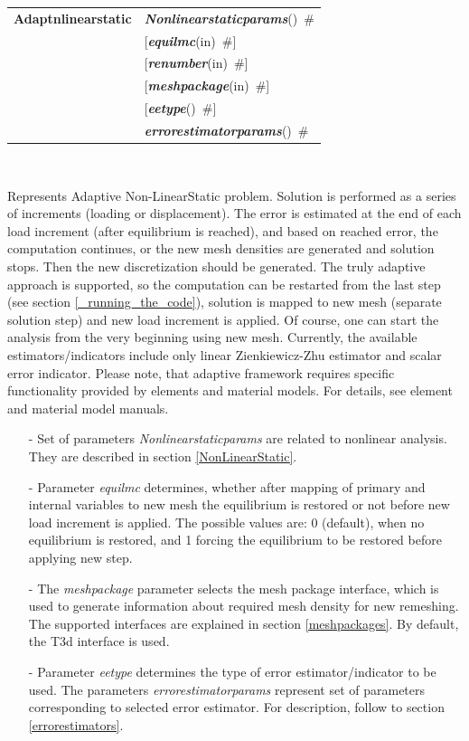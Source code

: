 \documentclass[a4paper]{article}
\makeatletter
\newcommand{\param}[1]{{\em #1}}
\newcommand{\keywordnotype}[1]{\mbox{{\it{\bf{#1}}}}}
\newcommand{\keyword}[2]{\mbox{{\keywordnotype{#1}\tiny (#2)}}}
\newcommand{\entKeywordInst}[1]{\mbox{{\bf{{#1}}}}}
\newcommand{\field}[2]{\mbox{\keyword{#1}{#2}~\#}}
\newcommand{\optField}[2]{\mbox{[\field{#1}{#2}]}}
\newenvironment{record}[1][]{\begin{tabular}{|ll}}{\end{tabular}\\}
\newcommand{\recentry}[2]{{#1}&{#2}\\}
\newcounter{rcc}
\newenvironment{record}[1][\textwidth]{\setcounter{rcc}{0}\begin{tabular*}{#1}{|ll@{\extracolsep{\fill}}r}}{\end{tabular*}\\}
\newcommand{\recentry}[2]{\ifthenelse{\value{rcc}>0}{&$\backslash$ \\}{\setcounter{rcc}{1}}{#1}&{#2}}
\makeatother
\begin{document}
\begin{record}
\recentry{\entKeywordInst{Adaptnlinearstatic}}{\field{Nonlinearstaticparams}{}}
\recentry{}{\optField{equilmc}{in}} \recentry{}{\optField{renumber}{in}} \recentry{}{\optField{meshpackage}{in}}
\recentry{}{\optField{eetype}{}} \recentry{}{\field{errorestimatorparams}{}}
\end{record}

Represents Adaptive Non-LinearStatic problem. Solution is performed  as a series of increments (loading or displacement).
The error is estimated at the end of each load increment (after
equilibrium is reached), and based on reached error, the computation
continues, or the new mesh densities are generated and solution
stops. Then the new discretization should be generated. 
The truly adaptive approach is supported, so the computation can be
restarted from the last step (see section \ref{_running_the_code}), solution is mapped to new mesh (separate
solution step) and new load increment is applied. Of course, one can start the analysis from
the very beginning using new mesh. Currently, the available
estimators/indicators include only linear 
Zienkiewicz-Zhu estimator and scalar error indicator. Please note, that adaptive framework requires
specific functionality provided by elements and material models. For
details, see element and material model manuals.
\begin{itemize}
\item[-]
Set of parameters \param{Nonlinearstaticparams} are related to
nonlinear analysis. They are described in section
\ref{NonLinearStatic}.
\item[-]
Parameter \param{equilmc} determines, whether after mapping of primary
and internal variables to new mesh the equilibrium is restored or not
before new load increment is applied. The possible values are: 0
(default), when no equilibrium is restored, and 1 forcing the
equilibrium to be restored before applying new step.
\item[-]
The \param{meshpackage} parameter selects the mesh package interface,
which is used to generate information about required mesh density for
new remeshing. The supported interfaces are explained in section
\ref{meshpackages}. By default, the T3d interface is used.
\item[-]
Parameter \param{eetype} determines the type of error
estimator/indicator to be used. The parameters
\param{errorestimatorparams} represent set of parameters corresponding
to selected error estimator. For description, follow to section
\ref{errorestimators}.
\end{itemize}
%
\end{document}
